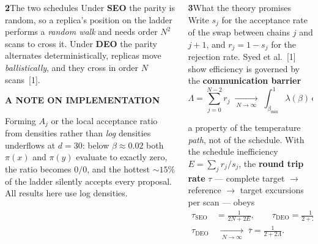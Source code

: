 \documentclass[final]{beamer}
\newcommand{\sechead}[2]{{\color{deepblue}\bfseries #1}\hspace{0.45em}#2}
\newlength{\colw}
\begin{document}
\begin{frame}[t]
\begin{columns}[t,totalwidth=\textwidth]
\begin{column}{\colw}
\begin{block}{\sechead{2}{The two schedules}}
Under \textcolor{seoblue}{\textbf{SEO}} the parity is random, so a replica's
position on the ladder performs a \emph{random walk} and needs order $N^2$
scans to cross it. Under \textcolor{deoorange}{\textbf{DEO}} the parity
alternates deterministically, replicas move \emph{ballistically}, and they
cross in order $N$ scans~[1].
\end{block}

\vspace{-1.0ex}
\begin{warmbox}
{\small\textbf{\textcolor{amber}{A NOTE ON IMPLEMENTATION}}}\par\vspace{1.2ex}
{\small Forming $A_j$ or the local acceptance ratio from densities rather than
\emph{log} densities underflows at $d=30$: below $\beta\approx0.02$ both
$\pi(x)$ and $\pi(y)$ evaluate to exactly zero, the ratio becomes $0/0$, and
the hottest ${\sim}15\%$ of the ladder silently accepts every proposal. All
results here use log densities.}
\end{warmbox}


\end{column}

\begin{column}{\colw}

\begin{block}{\sechead{3}{What the theory promises}}
Write $s_j$ for the acceptance rate of the swap between chains $j$ and $j+1$,
and $r_j=1-s_j$ for the rejection rate. Syed et al.~[1] show efficiency is
governed by the \textbf{communication barrier}
\vspace{-1.0ex}
\[
  \Lambda=\sum_{j=0}^{N-2} r_j
  \;\xrightarrow[\ N\to\infty\ ]{}\;
  \int_{\beta_{\min}}^{1}\lambda(\beta)\,\mathrm d\beta ,
\]
\vspace{-2.6ex}

a property of the temperature \emph{path}, not of the schedule. With the
schedule inefficiency $E=\sum_j r_j/s_j$, the \textbf{round trip rate} $\tau$
— complete target $\to$ reference $\to$ target excursions per scan — obeys
\vspace{-1.0ex}
\begin{align*}
  \tau_{\mathrm{SEO}}&=\frac{1}{2N+2E},
  \qquad
  \tau_{\mathrm{DEO}}=\frac{1}{2+2E},\\[1.0ex]
  \tau_{\mathrm{DEO}}&\;\xrightarrow[\ N\to\infty\ ]{}\;
  \bar\tau=\frac{1}{2+2\Lambda}.
\end{align*}
\vspace{-2.6ex}


\end{block}
\end{column}
\end{columns}
\end{frame}
\end{document}
